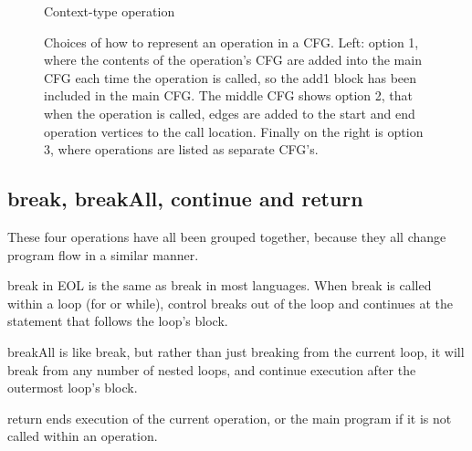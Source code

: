 \begin{figure}

\caption{Context-type operation}
\label{lst:contexttypeOp}
\end{figure}

\begin{figure}
\centering
\begin{minipage}{.3\textwidth}
  \centering
\end{minipage}%
\begin{minipage}{.3\textwidth}
  \centering
\end{minipage}
\begin{minipage}{.3\textwidth}
  \centering
\end{minipage}
\label{fig:operationOptions}
\caption{Choices of how to represent an operation in a CFG. Left: option 1, where the contents of the operation's CFG are added into the main CFG each time the operation is called, so the add1 block has been included in the main CFG. The middle CFG shows option 2, that when the operation is called, edges are added to the start and end operation vertices to the call location. Finally on the right is option 3, where operations are listed as separate CFG's. }
\end{figure}

\subsection{break, breakAll, continue and return}

These four operations have all been grouped together, because they all change program flow in a similar manner.

break in EOL is the same as break in most languages. When break is called within a loop (for or while), control breaks out of the loop and continues at the statement that follows the loop's block.

breakAll is like break, but rather than just breaking from the current loop, it will break from any number of nested loops, and continue execution after the outermost loop's block.

return ends execution of the current operation, or the main program if it is not called within an operation.

